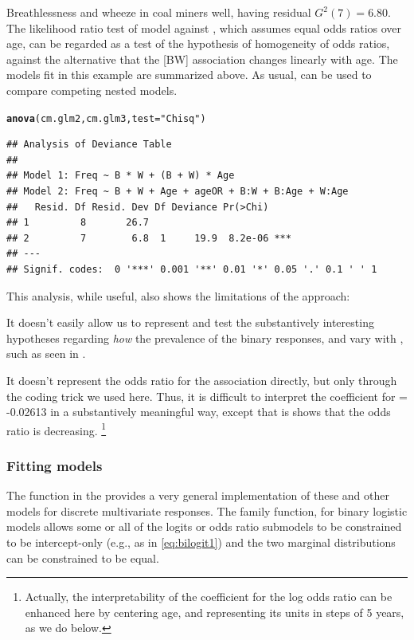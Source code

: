 \documentclass[11pt]{book}\usepackage[]{graphicx}\usepackage[]{color}
\makeatletter
\newcommand{\hlstr}[1]{\textcolor[rgb]{0.192,0.494,0.8}{#1}}%
\newcommand{\hlstd}[1]{\textcolor[rgb]{0.345,0.345,0.345}{#1}}%
\newcommand{\hlkwc}[1]{\textcolor[rgb]{0.333,0.667,0.333}{#1}}%
\newcommand{\hlkwd}[1]{\textcolor[rgb]{0.737,0.353,0.396}{\textbf{#1}}}%
\newenvironment{kframe}{%
 \def\at@end@of@kframe{}%
 \ifinner\ifhmode%
  \def\at@end@of@kframe{\end{minipage}}%
  \begin{minipage}{\columnwidth}%
 \fi\fi%
 \def\FrameCommand##1{\hskip\@totalleftmargin \hskip-\fboxsep
 \colorbox{shadecolor}{##1}\hskip-\fboxsep
     \hskip-\linewidth \hskip-\@totalleftmargin \hskip\columnwidth}%
 \MakeFramed {\advance\hsize-\width
   \@totalleftmargin\z@ \linewidth\hsize
   \@setminipage}}%
 {\par\unskip\endMakeFramed%
 \at@end@of@kframe}
\newenvironment{knitrout}{}{} %
\renewenvironment{knitrout}{\small\renewcommand{\baselinestretch}{.85}}{} %
\makeatother
\begin{document}
\begin{Example}[coalminers]{Breathlessness and wheeze in coal miners}
well, having residual $G^2 (7) = 6.80$.
The likelihood ratio test of
model  against , which assumes equal odds
ratios over age, can be regarded as a test of the hypothesis of
homogeneity of odds ratios, against the alternative that the [BW] association
changes linearly with age.  
The  models fit in this example are summarized above.
As usual,  can be used to compare competing nested models.
\begin{knitrout}
\color{fgcolor}\begin{kframe}
\begin{alltt}
\hlkwd{anova}\hlstd{(cm.glm2, cm.glm3,} \hlkwc{test}\hlstd{=}\hlstr{"Chisq"}\hlstd{)}
\end{alltt}
\begin{verbatim}
## Analysis of Deviance Table
## 
## Model 1: Freq ~ B * W + (B + W) * Age
## Model 2: Freq ~ B + W + Age + ageOR + B:W + B:Age + W:Age
##   Resid. Df Resid. Dev Df Deviance Pr(>Chi)    
## 1         8       26.7                         
## 2         7        6.8  1     19.9  8.2e-06 ***
## ---
## Signif. codes:  0 '***' 0.001 '**' 0.01 '*' 0.05 '.' 0.1 ' ' 1
\end{verbatim}
\end{kframe}
\end{knitrout}

This analysis, while useful, also shows the limitations of the  approach:
\begin{seriate}
  \item It doesn't easily allow us to represent and test the substantively interesting
  hypotheses regarding \emph{how} the prevalence of the binary responses,  and
   vary with , such as seen in .
  \item It doesn't represent the odds ratio for the  association directly,
  but only through the coding trick we used here.  Thus, it is difficult to interpret
  the coefficient for  = -0.02613 in a substantively
  meaningful way, except that is shows that the odds ratio is decreasing.%
\footnote{
Actually, the interpretability of the coefficient for the log odds ratio can be
enhanced here by centering age, and representing its units in steps of 5 years,
as we do below.
}
\end{seriate}

\subsubsection*{Fitting  models}
The  function in the  provides a very general implementation of these
and other models for discrete multivariate responses. The family function,
 for binary logistic models allows some or all of the logits or
odds ratio submodels to be constrained to be intercept-only (e.g., as in \eqref{eq:bilogit1})
and the two marginal distributions can be constrained to be equal.


\end{Example}
\end{document}
